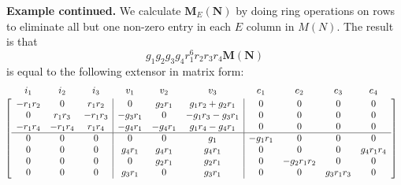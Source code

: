 \documentclass[12pt]{article}
\theoremstyle{definition}
\newcommand{\ext}[1]{\ensuremath{\mathbf{#1}}}
\begin{document}
\textbf{Example continued.}
We calculate $\ext{M}_E(\ext{N})$ by doing ring operations
on rows to eliminate all but one non-zero entry in each $E$ column in $M(N)$.  
The result is that
\[
g_1 g_2 g_3 g_4 r_1^6 r_2 r_3 r_4  \ext{M}(\ext{N})
\]
is equal to the following extensor in matrix form:
\[\hspace{-7pt}
\begin{array}{c}
\begin{array}{cccccccccc}
i_1 & i_2 & i_3 & v_1 & v_2 & v_3  & e_1  & e_2 & e_3 & e_4 \\[-1em]
\hphantom{-r_1r_4}&\hphantom{-r_1r_4}&\hphantom{-r_1r_4}&
\hphantom{-g_4r_1}&\hphantom{-g_4r_1}&\hphantom{-g_1r_3-g_3r_1}&
\hphantom{-g_1r_1}&\hphantom{-g_2r_1r_2}&\hphantom{g_3r_1r_3}&\hphantom{g_4r_1r_4}
\end{array}\\
\left[\begin{array}{ccc|ccc|cccc}
-r_1r_2 & 0      &r_1r_2  &  0    &g_2r_1 &g_1r_2+g_2r_1  &  0    &  0       &  0      &  0      \\
0       &r_1r_3  &-r_1r_3 &-g_3r_1&  0    &-g_1r_3-g_3r_1&  0    &  0       &  0      &  0      \\
-r_1r_4 &-r_1r_4 &r_1r_4  &-g_4r_1&-g_4r_1&g_1r_4-g_4r_1 &  0    &  0       &  0     &  0      \\ \hline
0       &0       &0       &0      &0      & g_1          &-g_1r_1&  0       &  0      &  0      \\ 
0       &0       &0       &g_4r_1 &g_4r_1 & g_4r_1       &  0    &  0       &  0      &g_4r_1r_4\\ 
0       &0       &0       &0      &g_2r_1 & g_2r_1       &  0    &-g_2r_1r_2&  0      &  0      \\ 
0       &0       &0       &g_3r_1 &0      & g_3r_1       &  0    &  0       &g_3r_1r_3&  0      
\end{array}\right]\end{array}
\]
\end{document}
